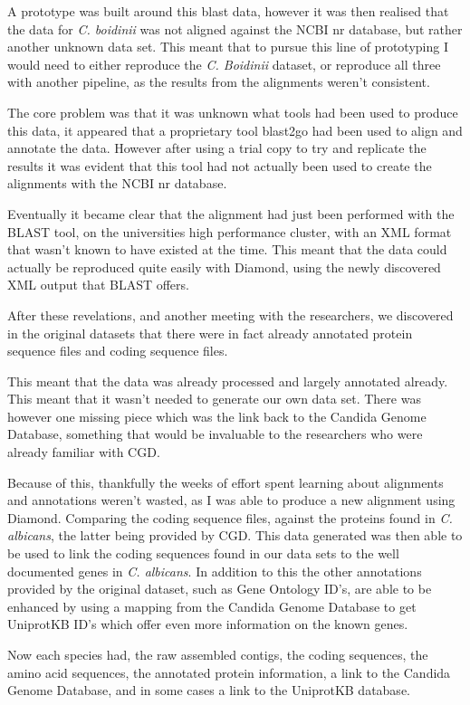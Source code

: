{A prototype was built around this blast data, however it was then realised that the data for \textit{C. boidinii} was not aligned against the NCBI nr database, but rather another unknown data set. This meant that to pursue this line of prototyping I would need to either reproduce the \textit{C. Boidinii} dataset, or reproduce all three with another pipeline, as the results from the alignments weren't consistent. 

The core problem was that it was unknown what tools had been used to produce this data, it appeared that a proprietary tool blast2go\cite{blast2go} had been used to align and annotate the data. However after using a trial copy to try and replicate the results it was evident that this tool had not actually been used to create the alignments with the NCBI nr database. 

Eventually it became clear that the alignment had just been performed with the BLAST tool, on the universities high performance cluster, with an XML format that wasn't known to have existed at the time. This meant that the data could actually be reproduced quite easily with Diamond, using the newly discovered XML output that BLAST offers.

After these revelations, and another meeting with the researchers, we discovered in the original datasets that there were in fact already annotated protein sequence files and coding sequence files.

This meant that the data was already processed and largely annotated already. This meant that it wasn't needed to generate our own data set. There was however one missing piece which was the link back to the Candida Genome Database, something that would be invaluable to the researchers who were already familiar with CGD. 

Because of this, thankfully the weeks of effort spent learning about alignments and annotations weren't wasted, as I was able to produce a new alignment using Diamond. Comparing the coding sequence files, against the proteins found in \textit{C. albicans}, the latter being provided by CGD. This data generated was then able to be used to link the coding sequences found in our data sets to the well documented genes in \textit{C. albicans}. In addition to this the other annotations provided by the original dataset, such as Gene Ontology ID's, are able to be enhanced by using a mapping from the Candida Genome Database to get UniprotKB ID's which offer even more information on the known genes. 

Now each species had, the raw assembled contigs, the coding sequences, the amino acid sequences, the annotated protein information, a link to the Candida Genome Database, and in some cases a link to the UniprotKB database.

}
